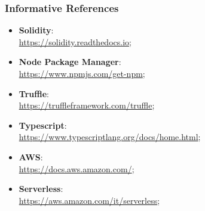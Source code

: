		\subsubsection{Informative References}
			\begin{itemize}
				\item \textbf{Solidity}: \\
				\url{https://solidity.readthedocs.io};
				
				\item \textbf{Node Package Manager}: \\
				\url{https://www.npmjs.com/get-npm};
				
				\item \textbf{Truffle}: \\
				\url{https://truffleframework.com/truffle};
				
				\item \textbf{Typescript}: \\
				\url{https://www.typescriptlang.org/docs/home.html};
				
				\item \textbf{AWS}: \\
				\url{https://docs.aws.amazon.com/};
				
				\item \textbf{Serverless}: \\
				\url{https://aws.amazon.com/it/serverless};
			\end{itemize}
